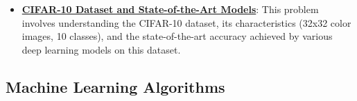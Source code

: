 \documentclass{article}%
\begin{document}
\begin{itemize}[leftmargin=*]
\item \href{https://purdue.brightspace.com/d2l/common/assets/pdfjs-d2l-dist/1.0.14-legacy/web/viewer.html?file=\%2Fcontent\%2Fenforced\%2F1095467-wl.202510.CS.24300.001\%2F09L1-cnn.pdf\%3Fou\%3D1095467\&lang=en-us\&container=d2l-fileviewer-rendered-pdf\&fullscreen=d2l-fileviewer-rendered-pdf-dialog\&height=667#page=23}{\textbf{CIFAR-10 Dataset and State-of-the-Art Models}}: This problem involves understanding the CIFAR-10 dataset, its characteristics (32x32 color images, 10 classes), and the state-of-the-art accuracy achieved by various deep learning models on this dataset.%
\end{itemize}

%
\subsection{Machine Learning Algorithms}%
\label{subsec:MachineLearningAlgorithms}%
\end{document}
